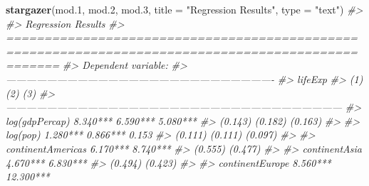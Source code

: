 \documentclass[]{book}
\newenvironment{Shaded}{\begin{snugshade}}{\end{snugshade}}
\newcommand{\CommentTok}[1]{\textcolor[rgb]{0.56,0.35,0.01}{\textit{#1}}}
\newcommand{\DataTypeTok}[1]{\textcolor[rgb]{0.13,0.29,0.53}{#1}}
\newcommand{\FloatTok}[1]{\textcolor[rgb]{0.00,0.00,0.81}{#1}}
\newcommand{\KeywordTok}[1]{\textcolor[rgb]{0.13,0.29,0.53}{\textbf{#1}}}
\newcommand{\NormalTok}[1]{#1}
\newcommand{\StringTok}[1]{\textcolor[rgb]{0.31,0.60,0.02}{#1}}
\begin{document}
\begin{Shaded}
\begin{Highlighting}[]
\KeywordTok{stargazer}\NormalTok{(mod}\FloatTok{.1}\NormalTok{, mod}\FloatTok{.2}\NormalTok{, mod}\FloatTok{.3}\NormalTok{, }\DataTypeTok{title =} \StringTok{"Regression Results"}\NormalTok{, }\DataTypeTok{type =} \StringTok{"text"}\NormalTok{)}
\CommentTok{#> }
\CommentTok{#> Regression Results}
\CommentTok{#> ===================================================================================================}
\CommentTok{#>                                                   Dependent variable:                              }
\CommentTok{#>                     -------------------------------------------------------------------------------}
\CommentTok{#>                                                         lifeExp                                    }
\CommentTok{#>                                 (1)                        (2)                       (3)           }
\CommentTok{#> ---------------------------------------------------------------------------------------------------}
\CommentTok{#> log(gdpPercap)               8.340***                   6.590***                  5.080***         }
\CommentTok{#>                               (0.143)                    (0.182)                   (0.163)         }
\CommentTok{#>                                                                                                    }
\CommentTok{#> log(pop)                     1.280***                   0.866***                    0.153          }
\CommentTok{#>                               (0.111)                    (0.111)                   (0.097)         }
\CommentTok{#>                                                                                                    }
\CommentTok{#> continentAmericas                                       6.170***                  8.740***         }
\CommentTok{#>                                                          (0.555)                   (0.477)         }
\CommentTok{#>                                                                                                    }
\CommentTok{#> continentAsia                                           4.670***                  6.830***         }
\CommentTok{#>                                                          (0.494)                   (0.423)         }
\CommentTok{#>                                                                                                    }
\CommentTok{#> continentEurope                                         8.560***                  12.300***        }

\end{Highlighting}
\end{Shaded}
\end{document}
